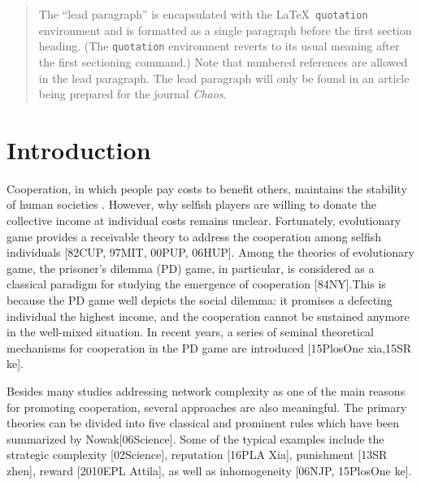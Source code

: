 \documentclass[%
 aip,
 amsmath,amssymb,
 reprint,%
]{revtex4-1}
\begin{document}
\maketitle

\begin{quotation}
The ``lead paragraph'' is encapsulated with the \LaTeX\
\verb+quotation+ environment and is formatted as a single paragraph before the first section heading.
(The \verb+quotation+ environment reverts to its usual meaning after the first sectioning command.)
Note that numbered references are allowed in the lead paragraph.
%
The lead paragraph will only be found in an article being prepared for the journal \textit{Chaos}.
\end{quotation}

\section{\label{sec:level1}Introduction}

Cooperation, in which people pay costs to benefit others, maintains the stability of human societies \cite{81Science,97MIT,71QRB}. However, why selfish players are willing to donate the collective income at individual costs remains unclear. Fortunately, evolutionary game provides a receivable theory to address the cooperation among selfish individuals [82CUP, 97MIT, 00PUP, 06HUP]. Among the theories of evolutionary game, the prisoner's dilemma (PD) game, in particular, is considered as a classical paradigm for studying the emergence of cooperation [84NY].This is because the PD game well depicts the social dilemma: it promises a defecting individual the highest income, and the cooperation cannot be sustained anymore in the well-mixed situation. In recent years, a series of seminal theoretical mechanisms for cooperation in the PD game are introduced [15PlosOne xia,15SR ke].

Besides many studies addressing network complexity as one of the main reasons for promoting cooperation, several approaches are also meaningful. The primary theories can be divided into five classical and prominent rules which have been summarized by Nowak[06Science]. Some of the typical examples include the strategic complexity [02Science], reputation [16PLA Xia], punishment [13SR zhen], reward [2010EPL Attila], as well as inhomogeneity [06NJP, 15PlosOne ke].
\end{document}
